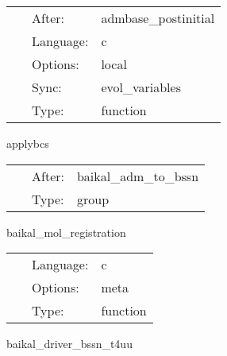 \begin{tabular*}{160mm}{cll} 
~ & After:  & admbase\_postinitial \\ 
~ & Language:  & c \\ 
~ & Options:  & local \\ 
~ & Sync:  & evol\_variables \\ 
~ & Type:  & function \\ 
\end{tabular*} 


\vspace{5mm}


\hspace{5mm} applybcs 

\hspace{5mm}{\it apply boundary conditions } 


\hspace{5mm}

 \begin{tabular*}{160mm}{cll} 
~ & After:  & baikal\_adm\_to\_bssn \\ 
~ & Type:  & group \\ 
\end{tabular*} 


\vspace{5mm}


\hspace{5mm} baikal\_mol\_registration 

\hspace{5mm}{\it register variables for mol } 


\hspace{5mm}

 \begin{tabular*}{160mm}{cll} 
~ & Language:  & c \\ 
~ & Options:  & meta \\ 
~ & Type:  & function \\ 
\end{tabular*} 


\vspace{5mm}


\hspace{5mm} baikal\_driver\_bssn\_t4uu 

\hspace{5mm}{\it mol: compute t4uu, needed for bssn rhss. } 


